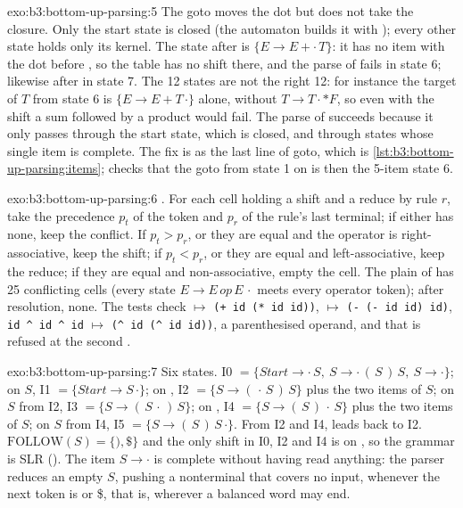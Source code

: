 \begin{solution}{exo:b3:bottom-up-parsing:5}
The goto moves the dot but does not take the closure. Only the start state is closed (the automaton builds it with ); every other state holds only its kernel. The state after \code{+} is $\{E \to E + \cdot\,T\}$: it has no item with the dot before , so the table has no shift there, and the parse of  fails in state 6; likewise after \code{*} in state 7. The 12 states are not the right 12: for instance the target of $T$ from state 6 is $\{E \to E + T\,\cdot\}$ alone, without $T \to T \cdot * F$, so even with the shift a sum followed by a product would fail. The parse of  succeeds because it only passes through the start state, which is closed, and through states whose single item is complete. The fix is  as the last line of goto, which is \cref{lst:b3:bottom-up-parsing:items};  checks that the goto from state 1 on \code{+} is then the 5-item state 6.
\end{solution}

\begin{solution}{exo:b3:bottom-up-parsing:6}
. For each cell holding a shift and a reduce by rule $r$, take the precedence $p_t$ of the token and $p_r$ of the rule's last terminal; if either has none, keep the conflict. If $p_t > p_r$, or they are equal and the operator is right-associative, keep the shift; if $p_t < p_r$, or they are equal and left-associative, keep the reduce; if they are equal and non-associative, empty the cell. The plain  of  has 25 conflicting cells (every state $E \to E\,\mathit{op}\,E\,\cdot$ meets every operator token); after resolution, none. The tests check  $\mapsto$ \texttt{(+ id (* id id))},  $\mapsto$ \texttt{(- (- id id) id)}, \texttt{id \textasciicircum{} id \textasciicircum{} id} $\mapsto$ \texttt{(\textasciicircum{} id (\textasciicircum{} id id))}, a parenthesised operand, and that  is refused at the second \code{==}.
\end{solution}

\begin{solution}{exo:b3:bottom-up-parsing:7}
Six states. I0 $= \{\mathit{Start} \to \cdot\,S,\ S \to \cdot\,(\,S\,)\,S,\ S \to \cdot\}$; on $S$, I1 $= \{\mathit{Start} \to S\,\cdot\}$; on \code{(}, I2 $= \{S \to (\,\cdot\,S\,)\,S\}$ plus the two items of $S$; on $S$ from I2, I3 $= \{S \to (\,S\,\cdot\,)\,S\}$; on \code{)}, I4 $= \{S \to (\,S\,)\,\cdot\,S\}$ plus the two items of $S$; on $S$ from I4, I5 $= \{S \to (\,S\,)\,S\,\cdot\}$. From I2 and I4, \code{(} leads back to I2. $\mathrm{FOLLOW}(S) = \{), \$\}$ and the only shift in I0, I2 and I4 is on \code{(}, so the grammar is SLR (). The item $S \to \cdot$ is complete without having read anything: the parser reduces an empty $S$, pushing a nonterminal that covers no input, whenever the next token is \code{)} or \$, that is, wherever a balanced word may end.
\end{solution}

